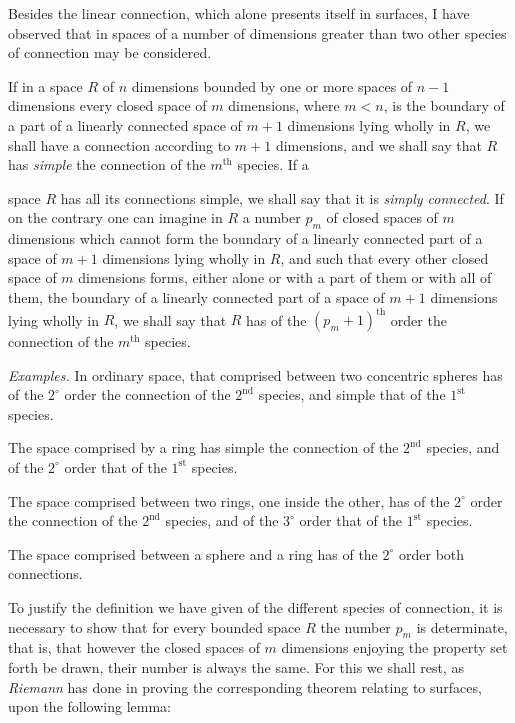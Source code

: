 \documentclass{article}
\begin{document}
Besides the linear connection, which alone presents itself in surfaces, I have observed that in spaces of a number of dimensions greater than two other species of connection may be considered.

If in a space $R$ of $n$ dimensions bounded by one or more spaces of $n-1$ dimensions every closed space of $m$ dimensions, where $m < n$, is the boundary of a part of a linearly connected space of $m+1$ dimensions lying wholly in $R$, we shall have a connection according to $m+1$ dimensions, and we shall say that $R$ has \emph{simple} the connection of the $m^{\text{th}}$ species. If a

space $R$ has all its connections simple, we shall say that it is \emph{simply connected}. If on the contrary one can imagine in $R$ a number $p_{m}$ of closed spaces of $m$ dimensions which cannot form the boundary of a linearly connected part of a space of $m+1$ dimensions lying wholly in $R$, and such that every other closed space of $m$ dimensions forms, either alone or with a part of them or with all of them, the boundary of a linearly connected part of a space of $m+1$ dimensions lying wholly in $R$, we shall say that $R$ has of the $(p_{m}+1)^{\text{th}}$ order the connection of the $m^{\text{th}}$ species.

\emph{Examples.} In ordinary space, that comprised between two concentric spheres has of the $2^{\circ}$ order the connection of the $2^{\text{nd}}$ species, and simple that of the $1^{\text{st}}$ species.

The space comprised by a ring has simple the connection of the $2^{\text{nd}}$ species, and of the $2^{\circ}$ order that of the $1^{\text{st}}$ species.

The space comprised between two rings, one inside the other, has of the $2^{\circ}$ order the connection of the $2^{\text{nd}}$ species, and of the $3^{\circ}$ order that of the $1^{\text{st}}$ species.

The space comprised between a sphere and a ring has of the $2^{\circ}$ order both connections.

To justify the definition we have given of the different species of connection, it is necessary to show that for every bounded space $R$ the number $p_{m}$ is determinate, that is, that however the closed spaces of $m$ dimensions enjoying the property set forth be drawn, their number is always the same. For this we shall rest, as \emph{Riemann} has done in proving the corresponding theorem relating to surfaces, upon the following lemma:
\end{document}
